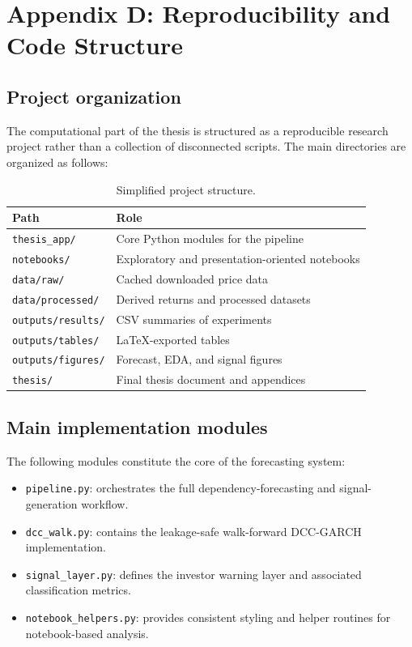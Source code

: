 ﻿\section{Appendix D: Reproducibility and Code Structure}

\subsection{Project organization}

The computational part of the thesis is structured as a reproducible research project rather than a collection of disconnected scripts. The main directories are organized as follows:

\begin{table}[H]
    \centering
    \caption{Simplified project structure.}
    \begin{tabular}{ll}
        \toprule
        Path & Role \\
        \midrule
        \texttt{thesis\_app/} & Core Python modules for the pipeline \\
        \texttt{notebooks/} & Exploratory and presentation-oriented notebooks \\
        \texttt{data/raw/} & Cached downloaded price data \\
        \texttt{data/processed/} & Derived returns and processed datasets \\
        \texttt{outputs/results/} & CSV summaries of experiments \\
        \texttt{outputs/tables/} & LaTeX-exported tables \\
        \texttt{outputs/figures/} & Forecast, EDA, and signal figures \\
        \texttt{thesis/} & Final thesis document and appendices \\
        \bottomrule
    \end{tabular}
\end{table}

\subsection{Main implementation modules}

The following modules constitute the core of the forecasting system:

\begin{itemize}
    \item \texttt{pipeline.py}: orchestrates the full dependency-forecasting and signal-generation workflow.
    \item \texttt{dcc\_walk.py}: contains the leakage-safe walk-forward DCC-GARCH implementation.
    \item \texttt{signal\_layer.py}: defines the investor warning layer and associated classification metrics.
    \item \texttt{notebook\_helpers.py}: provides consistent styling and helper routines for notebook-based analysis.
\end{itemize}

